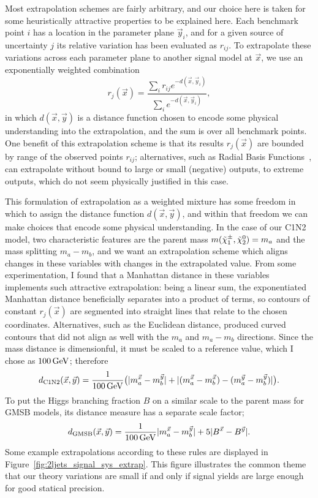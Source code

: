 Most extrapolation schemes are fairly arbitrary, and our choice here is taken
for some heuristically attractive properties to be explained here.
Each benchmark point $i$ has a location in the parameter plane $\vec y_i$, and
for a given source of uncertainty $j$ its relative variation has been evaluated
as $r_{ij}$.
To extrapolate these variations across each parameter plane to another signal
model at $\vec x$, we use an exponentially weighted combination
\begin{equation}
\label{eqn:2ljets_signal_extrap}
r_j(\vec x) = \frac{
\sum_i r_{ij} e^{-d(\vec x, \vec y_i)}
}{
\sum_i e^{-d(\vec x, \vec y_i)}
}
,
\end{equation}
in which $d(\vec x, \vec y)$ is a distance function chosen to encode some
physical understanding into the extrapolation, and the sum is over all
benchmark points.
One benefit of this extrapolation scheme is that its results $r_j(\vec x)$
are bounded by range of the observed points $r_{ij}$;
alternatives, such as Radial Basis
Functions~\cite{2020SciPy-NMeth,fasshauer2007meshfree}, can extrapolate without
bound to large or small (negative) outputs, to extreme outputs, which do not
seem physically justified in this case.

This formulation of extrapolation as a weighted mixture has some freedom in
which to assign the distance function $d(\vec x, \vec y)$, and within that
freedom we can make choices that encode some physical understanding.
In the case of our C1N2 model, two characteristic features are the
parent mass $m(\chargino_1, \neutralino_2) = m_a$
and the mass splitting $m_a - m_b$, and we want an extrapolation scheme which
aligns changes in these variables with changes in the extrapolated value.
From some experimentation, I found that a Manhattan distance in these variables
implements such attractive extrapolation:
being a linear sum, the exponentiated Manhattan distance beneficially
separates into a product of terms, so contours of constant $r_j(\vec x)$ are
segmented into straight lines that relate to the chosen coordinates.
Alternatives, such as the Euclidean distance, produced curved contours that did
not align as well with the $m_a$ and $m_a - m_b$ directions.
Since the mass distance is dimensionful, it must be scaled to a reference
value, which I chose as $100\,\eV[G]$; therefore
\begin{equation}
d_\mathrm{C1N2}(\vec x, \vec y) =
\frac{1}{100\,\eV[G]}
\big(
|m_a^{\vec x} - m_b^{\vec y}|
+
|(m_a^{\vec x} - m_b^{\vec x}) - (m_a^{\vec y} - m_b^{\vec y})|
\big)
.
\end{equation}
To put the Higgs branching fraction $B$ on a similar scale to the parent mass
for GMSB models, its distance measure has a separate scale factor;
\begin{equation}
d_\mathrm{GMSB}(\vec x, \vec y) =
\frac{1}{100\,\eV[G]}
|m_a^{\vec x} - m_b^{\vec y}|
+
5
|B^{\vec x} - B^{\vec y}|
.
\end{equation}
Some example extrapolations according to these rules are displayed in
Figure~\ref{fig:2ljets_signal_sys_extrap}.
This figure illustrates the common theme that our theory variations are small
if and only if signal yields are large enough for good statical precision.


